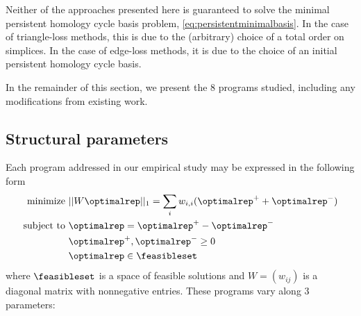 Neither of the approaches presented here is guaranteed to solve the minimal persistent homology cycle basis problem, \eq \eqref{eq:persistentminimalbasis}.  In the case of triangle-loss methods, this is due to the (arbitrary) choice of a total order on simplices.  In the case of edge-loss methods, it is due to the choice of an initial persistent homology cycle basis.  

In the remainder of this section, we present the 8 programs studied, including any modifications from existing work.

\subsection{Structural parameters}
\label{sec_structuralparams}

Each program addressed in our empirical study may be expressed in the following form
\begin{align}
\begin{split}
    \text{minimize } & || W \optimalrep||_1 = \sum_i w_{i,i} (\optimalrep^+ + \optimalrep^-) \\
    \text{subject to } 
    & \optimalrep = \optimalrep^+ - \optimalrep^- \\
    & \optimalrep^+, \optimalrep^- \ge 0 \\
    & \optimalrep \in \feasibleset
\end{split}
\label{eq:generalformofourprgorams}
\end{align}
where $\feasibleset$ is a space of feasible solutions and $W = (w_{ij})$ is a diagonal matrix with nonnegative entries.  These programs vary along 3 parameters:
